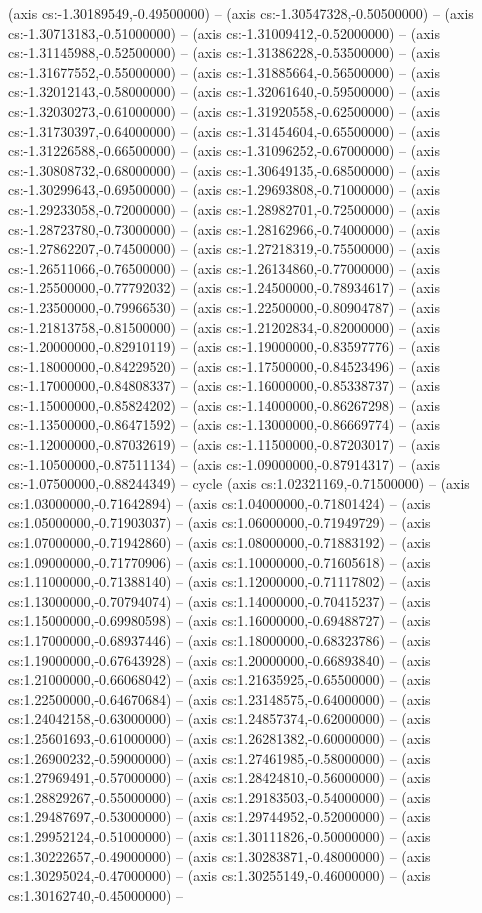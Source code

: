 (axis cs:-1.30189549,-0.49500000) -- (axis cs:-1.30547328,-0.50500000) -- (axis cs:-1.30713183,-0.51000000) -- (axis cs:-1.31009412,-0.52000000) -- (axis cs:-1.31145988,-0.52500000) -- (axis cs:-1.31386228,-0.53500000) -- (axis cs:-1.31677552,-0.55000000) -- (axis cs:-1.31885664,-0.56500000) -- (axis cs:-1.32012143,-0.58000000) -- (axis cs:-1.32061640,-0.59500000) -- (axis cs:-1.32030273,-0.61000000) -- (axis cs:-1.31920558,-0.62500000) -- (axis cs:-1.31730397,-0.64000000) -- (axis cs:-1.31454604,-0.65500000) -- (axis cs:-1.31226588,-0.66500000) -- (axis cs:-1.31096252,-0.67000000) -- (axis cs:-1.30808732,-0.68000000) -- (axis cs:-1.30649135,-0.68500000) -- (axis cs:-1.30299643,-0.69500000) -- (axis cs:-1.29693808,-0.71000000) -- (axis cs:-1.29233058,-0.72000000) -- (axis cs:-1.28982701,-0.72500000) -- (axis cs:-1.28723780,-0.73000000) -- (axis cs:-1.28162966,-0.74000000) -- (axis cs:-1.27862207,-0.74500000) -- (axis cs:-1.27218319,-0.75500000) -- (axis cs:-1.26511066,-0.76500000) -- (axis cs:-1.26134860,-0.77000000) -- (axis cs:-1.25500000,-0.77792032) -- (axis cs:-1.24500000,-0.78934617) -- (axis cs:-1.23500000,-0.79966530) -- (axis cs:-1.22500000,-0.80904787) -- (axis cs:-1.21813758,-0.81500000) -- (axis cs:-1.21202834,-0.82000000) -- (axis cs:-1.20000000,-0.82910119) -- (axis cs:-1.19000000,-0.83597776) -- (axis cs:-1.18000000,-0.84229520) -- (axis cs:-1.17500000,-0.84523496) -- (axis cs:-1.17000000,-0.84808337) -- (axis cs:-1.16000000,-0.85338737) -- (axis cs:-1.15000000,-0.85824202) -- (axis cs:-1.14000000,-0.86267298) -- (axis cs:-1.13500000,-0.86471592) -- (axis cs:-1.13000000,-0.86669774) -- (axis cs:-1.12000000,-0.87032619) -- (axis cs:-1.11500000,-0.87203017) -- (axis cs:-1.10500000,-0.87511134) -- (axis cs:-1.09000000,-0.87914317) -- (axis cs:-1.07500000,-0.88244349) -- cycle (axis cs:1.02321169,-0.71500000) -- (axis cs:1.03000000,-0.71642894) -- (axis cs:1.04000000,-0.71801424) -- (axis cs:1.05000000,-0.71903037) -- (axis cs:1.06000000,-0.71949729) -- (axis cs:1.07000000,-0.71942860) -- (axis cs:1.08000000,-0.71883192) -- (axis cs:1.09000000,-0.71770906) -- (axis cs:1.10000000,-0.71605618) -- (axis cs:1.11000000,-0.71388140) -- (axis cs:1.12000000,-0.71117802) -- (axis cs:1.13000000,-0.70794074) -- (axis cs:1.14000000,-0.70415237) -- (axis cs:1.15000000,-0.69980598) -- (axis cs:1.16000000,-0.69488727) -- (axis cs:1.17000000,-0.68937446) -- (axis cs:1.18000000,-0.68323786) -- (axis cs:1.19000000,-0.67643928) -- (axis cs:1.20000000,-0.66893840) -- (axis cs:1.21000000,-0.66068042) -- (axis cs:1.21635925,-0.65500000) -- (axis cs:1.22500000,-0.64670684) -- (axis cs:1.23148575,-0.64000000) -- (axis cs:1.24042158,-0.63000000) -- (axis cs:1.24857374,-0.62000000) -- (axis cs:1.25601693,-0.61000000) -- (axis cs:1.26281382,-0.60000000) -- (axis cs:1.26900232,-0.59000000) -- (axis cs:1.27461985,-0.58000000) -- (axis cs:1.27969491,-0.57000000) -- (axis cs:1.28424810,-0.56000000) -- (axis cs:1.28829267,-0.55000000) -- (axis cs:1.29183503,-0.54000000) -- (axis cs:1.29487697,-0.53000000) -- (axis cs:1.29744952,-0.52000000) -- (axis cs:1.29952124,-0.51000000) -- (axis cs:1.30111826,-0.50000000) -- (axis cs:1.30222657,-0.49000000) -- (axis cs:1.30283871,-0.48000000) -- (axis cs:1.30295024,-0.47000000) -- (axis cs:1.30255149,-0.46000000) -- (axis cs:1.30162740,-0.45000000) -- 
